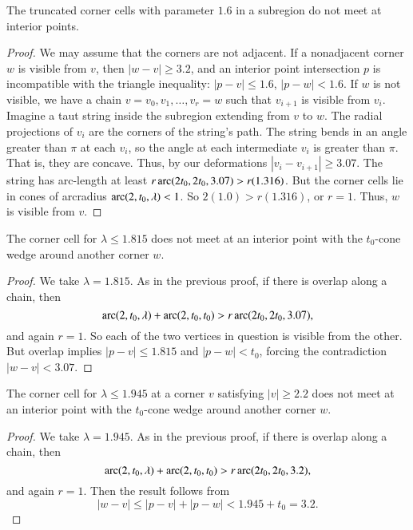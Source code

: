 \begin{lemma}
The truncated corner cells with parameter $1.6$ in a subregion do
not meet at interior points.
\end{lemma}

\begin{proof}
We may assume that the corners are not adjacent. If a nonadjacent
corner $w$ is visible from $v$, then $|w-v|\ge3.2$, and an
interior point intersection $p$ is incompatible with the triangle
inequality: $|p-v|\le 1.6$, $|p-w|<1.6$. If $w$ is not visible, we
have a chain $v=v_0,v_1,\ldots,v_r=w$ such that $v_{i+1}$ is
visible from $v_i$. Imagine a taut string inside the subregion
extending from $v$ to $w$. The radial projections of $v_i$ are the
corners of the string's path.   The string bends in an angle
greater than $\pi$ at each $v_i$, so the angle at each
intermediate $v_i$ is greater than $\pi$. That is, they are
concave. Thus, by our deformations $|v_i-v_{i+1}|\ge3.07$. The
string has arc-length at least $r \operatorname{arc}(2t_0,2t_0,3.07)>r (1.316)$.
But the corner cells lie in cones of arcradius
$\operatorname{arc}(2,t_0,\lambda)< 1$. So $2(1.0)>r(1.316)$, or $r=1$.  Thus,
$w$ is visible from $v$.
\end{proof}

\begin{lemma}
The corner cell for $\lambda \le 1.815$ does not meet at an
interior point with the $t_0$-cone wedge around another corner
$w$.
\end{lemma}

\begin{proof}
We take $\lambda=1.815$. As in the previous proof, if there is overlap
along a chain, then
    $$\operatorname{arc}(2,t_0,\lambda) +\operatorname{arc}(2,t_0,t_0) > r \operatorname{arc}(2t_0,2t_0,3.07),$$
and again $r=1$.  So each of the two vertices in question is visible
from the other. But overlap implies $|p-v|\le1.815$ and $|p-w|<t_0$,
forcing the contradiction $|w-v|<3.07$.
\end{proof}

\begin{lemma}
The corner cell for $\lambda \le 1.945$ at a corner $v$ satisfying
$|v|\ge2.2$ does not meet at an interior point with the $t_0$-cone
wedge around another corner $w$.
\end{lemma}

\begin{proof}
We take $\lambda=1.945$. As in the previous proof, if there is overlap
along a chain, then
    $$\operatorname{arc}(2,t_0,\lambda) +\operatorname{arc}(2,t_0,t_0) > r \operatorname{arc}(2t_0,2t_0,3.2),$$
and again $r=1$.  Then the result follows from
    $$|w-v|\le |p-v|+|p-w| < 1.945 + t_0 = 3.2.$$
\end{proof}





